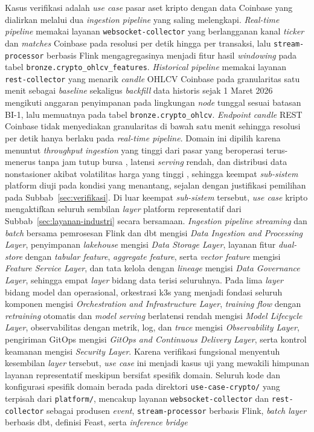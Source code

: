 Kasus verifikasi adalah \textit{use case} pasar aset kripto dengan data Coinbase yang dialirkan melalui dua \textit{ingestion pipeline} yang saling melengkapi. \textit{Real-time pipeline} memakai layanan \texttt{websocket-collector} yang berlangganan kanal \textit{ticker} dan \textit{matches} Coinbase pada resolusi per detik hingga per transaksi, lalu \texttt{stream-processor} berbasis Flink mengagregasinya menjadi fitur hasil \textit{windowing} pada tabel \texttt{bronze.crypto\_ohlcv\_features}. \textit{Historical pipeline} memakai layanan \texttt{rest-collector} yang menarik \textit{candle} OHLCV Coinbase pada granularitas satu menit sebagai \textit{baseline} sekaligus \textit{backfill} data historis sejak 1 Maret 2026 mengikuti anggaran penyimpanan pada lingkungan \textit{node} tunggal sesuai batasan BI-1, lalu memuatnya pada tabel \texttt{bronze.crypto\_ohlcv}. \textit{Endpoint} \textit{candle} REST Coinbase tidak menyediakan granularitas di bawah satu menit sehingga resolusi per detik hanya berlaku pada \textit{real-time pipeline}. Domain ini dipilih karena menuntut \textit{throughput} \textit{ingestion} yang tinggi dari pasar yang beroperasi terus-menerus tanpa jam tutup bursa \autocite{makarov2020trading}, latensi \textit{serving} rendah, dan distribusi data nonstasioner akibat volatilitas harga yang tinggi \autocite{katsiampa2017volatility}, sehingga keempat \textit{sub-sistem} platform diuji pada kondisi yang menantang, sejalan dengan justifikasi pemilihan pada Subbab~\ref{sec:verifikasi}. Di luar keempat \textit{sub-sistem} tersebut, \textit{use case} kripto mengaktifkan seluruh sembilan \textit{layer} platform representatif dari Subbab~\ref{sec:layanan-industri} secara bersamaan. \textit{Ingestion pipeline} \textit{streaming} dan \textit{batch} bersama pemrosesan Flink dan dbt mengisi \textit{Data Ingestion and Processing Layer}, penyimpanan \textit{lakehouse} mengisi \textit{Data Storage Layer}, layanan fitur \textit{dual-store} dengan \textit{tabular feature}, \textit{aggregate feature}, serta \textit{vector feature} mengisi \textit{Feature Service Layer}, dan tata kelola dengan \textit{lineage} mengisi \textit{Data Governance Layer}, sehingga empat \textit{layer} bidang data terisi seluruhnya. Pada lima \textit{layer} bidang model dan operasional, orkestrasi k3s yang menjadi fondasi seluruh komponen mengisi \textit{Orchestration and Infrastructure Layer}, \textit{training flow} dengan \textit{retraining} otomatis dan \textit{model serving} berlatensi rendah mengisi \textit{Model Lifecycle Layer}, observabilitas dengan metrik, log, dan \textit{trace} mengisi \textit{Observability Layer}, pengiriman GitOps mengisi \textit{GitOps and Continuous Delivery Layer}, serta kontrol keamanan mengisi \textit{Security Layer}. Karena verifikasi fungsional menyentuh kesembilan \textit{layer} tersebut, \textit{use case} ini menjadi kasus uji yang mewakili himpunan layanan representatif meskipun bersifat spesifik domain. Seluruh kode dan konfigurasi spesifik domain berada pada direktori \texttt{use-case-crypto/} yang terpisah dari \texttt{platform/}, mencakup layanan \texttt{websocket-collector} dan \texttt{rest-collector} sebagai produsen \textit{event}, \texttt{stream-processor} berbasis Flink, \textit{batch layer} berbasis dbt, definisi Feast, serta \textit{inference bridge} 